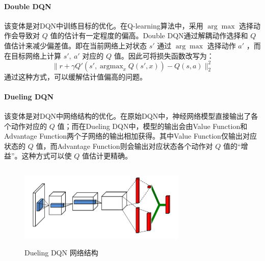 \documentclass[a4paper,12pt]{article}
\begin{document}
\begin{CJK}{UTF8}{gbsn}
\paragraph{Double DQN} 该变体是对DQN中训练目标的优化。在Q-learning算法中，采用 $\arg\max$ 选择动作会导致对 $Q$ 值的估计有一定程度的偏高\cite{ref3}。Double DQN通过解耦动作选择和 $Q$ 值估计来减少偏差值。即在当前网络上对状态 $s'$ 通过 $\arg\max$ 选择动作 $a'$ ，而在目标网络上计算 $s',\ a'$ 对应的 $Q$ 值。因此可将损失函数改写为：
$$
\|r+\gamma Q'(s',\mathop{\arg\max}_{x} Q(s',x))-Q(s,a)\|_2^2
$$
通过这种方式，可以缓解估计值偏高的问题。
\paragraph{Dueling DQN} 该变体是对DQN中网络结构的优化。在原始DQN中，神经网络模型直接输出了各个动作对应的 $Q$ 值；而在Dueling DQN中，模型的输出会由Value Function和Advantage Function两个子网络的输出相加获得。其中Value Function仅输出对应状态的 $Q$ 值，而Advantage Function则会输出对应状态各个动作对 $Q$ 值的“增益”。这种方式可以使 $Q$ 值估计更精确。
\begin{figure}[h!]
\centering
\includegraphics[width=8cm,height=4cm]{./resource/dueling_architecture.png}
\caption{Dueling DQN 网络结构\cite{ref4}}
\end{figure}
\newpage

\end{CJK}
\end{document}
